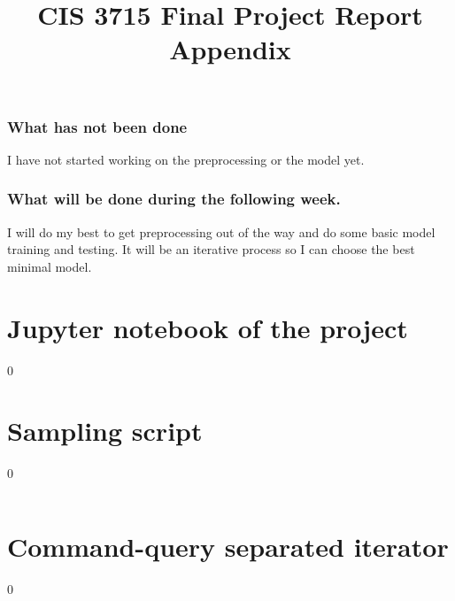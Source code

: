 \documentclass[11pt]{report}
\let\oldpart\part%
\renewcommand*\part[1]{\oldpart{#1}\setcounter{section}0}%
\begin{document}
\section{What has not been done}

I have not started working on the preprocessing or the model yet.

\section{What will be done during the following week.}

I will do my best to get preprocessing out of the way and do some basic model training and testing.
It will be an iterative process
so I can choose the best minimal model.

\newpage
\appendix
\title{CIS 3715 Final Project Report Appendix}

\maketitle

\part{Jupyter notebook of the project}
\graphicspath{{ipynb/}}


\part{Sampling script}
\inputminted{python}{src/sample_dataset.py}

\part{Command-query separated iterator}
\inputminted{python}{src/cqs_iter.py}
\end{document}
